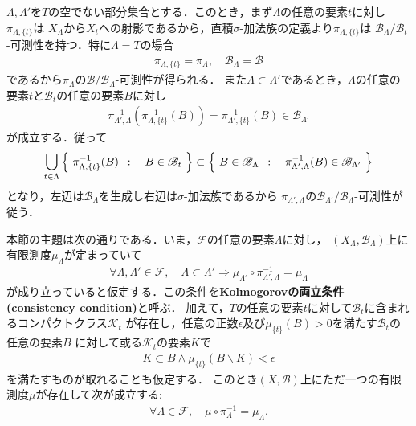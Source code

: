	\begin{prf}
		$\Lambda,\Lambda'$を$T$の空でない部分集合とする．このとき，まず$\Lambda$の任意の要素$t$に対し$\pi_{\Lambda,\{t\}}$は
		$X_\Lambda$から$X_t$への射影であるから，直積$\sigma$-加法族の定義より$\pi_{\Lambda,\{t\}}$は
		$\mathscr{B}_\Lambda/\mathscr{B}_t$-可測性を持つ．特に$\Lambda=T$の場合
		\begin{align}
			\pi_{\Lambda,\{t\}} = \pi_\Lambda,\quad \mathscr{B}_\Lambda = \mathscr{B}
		\end{align}
		であるから$\pi_\Lambda$の$\mathscr{B}/\mathscr{B}_\Lambda$-可測性が得られる．
		また$\Lambda \subset \Lambda'$であるとき，$\Lambda$の任意の要素$t$と$\mathscr{B}_t$の任意の要素$B$に対し
		\begin{align}
			\pi_{\Lambda',\Lambda}^{-1}\left(\pi_{\Lambda,\{t\}}^{-1}(B)\right)
			= \pi_{\Lambda',\{t\}}^{-1}(B) \in \mathscr{B}_{\Lambda'}
		\end{align}
		が成立する．従って
		\begin{align}
			\bigcup_{t\in\Lambda} \left\{\ \pi_{\Lambda,\{t\}}^{-1}(B)\ \, : \quad B \in \mathscr{B}_t\ \right\}
			\subset \left\{\ B \in \mathscr{B}_\Lambda\ \, : \quad \pi_{\Lambda',\Lambda}^{-1}(B) \in \mathscr{B}_{\Lambda'}\ \right\}
		\end{align}
		となり，左辺は$\mathscr{B}_\Lambda$を生成し右辺は$\sigma$-加法族であるから
		$\pi_{\Lambda',\Lambda}$の$\mathscr{B}_{\Lambda'}/\mathscr{B}_\Lambda$-可測性が従う．
		\QED
	\end{prf}
	
	本節の主題は次の通りである．いま，$\mathscr{F}$の任意の要素$\Lambda$に対し，
	$(X_\Lambda,\mathscr{B}_\Lambda)$上に有限測度$\mu_\Lambda$が定まっていて
	\begin{align}
		\forall \Lambda,\Lambda' \in \mathscr{F},\quad
		\Lambda \subset \Lambda' \Longrightarrow
		\mu_{\Lambda'} \circ \pi_{\Lambda',\Lambda}^{-1}
		= \mu_\Lambda
	\end{align}
	が成り立っていると仮定する．この条件を{\bf Kolmogorovの両立条件}
	{\bf (consistency condition)}と呼ぶ．
	加えて，$T$の任意の要素$t$に対して$\mathscr{B}_t$に含まれるコンパクトクラス$\mathcal{K}_t$
	が存在し，任意の正数$\epsilon$及び$\mu_{\{t\}}(B) > 0$を満たす$\mathscr{B}_t$の任意の要素$B$
	に対して或る$\mathcal{K}_t$の要素$K$で
	\begin{align}
		K \subset B \wedge \mu_{\{t\}}(B \backslash K) < \epsilon
	\end{align}
	を満たすものが取れることも仮定する．
	このとき$(X,\mathscr{B})$上にただ一つの有限測度$\mu$が存在して次が成立する:
	\begin{align}
		\forall \Lambda \in \mathscr{F},\quad 
		\mu \circ \pi_{\Lambda}^{-1} = \mu_\Lambda.
	\end{align}
	
